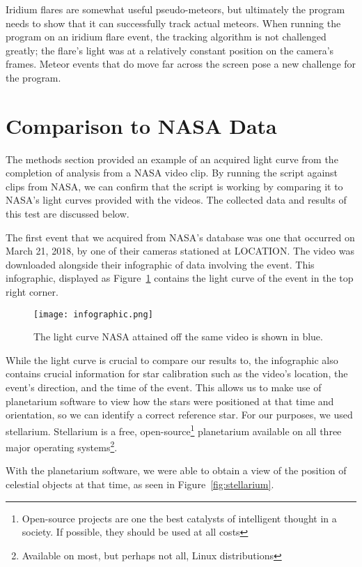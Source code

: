 Iridium flares are somewhat useful pseudo-meteors, but ultimately the program needs to show that it can successfully track actual meteors. When running the program on an iridium flare event, the tracking algorithm is not challenged greatly; the flare's light was at a relatively constant position on the camera's frames. Meteor events that do move far across the screen pose a new challenge for the program.

\section{Comparison to NASA Data}

The methods section provided an example of an acquired light curve from the completion of analysis from a NASA video clip. By running the script against clips from NASA, we can confirm that the script is working by comparing it to NASA's light curves provided with the videos. The collected data and results of this test are discussed below.

The first event that we acquired from NASA's database was one that occurred on March 21, 2018, by one of their cameras stationed at LOCATION. The video was downloaded alongside their infographic of data involving the event. This infographic, displayed as Figure~\ref{fig:infographic} contains the light curve of the event in the top right corner. 

\begin{figure}[ht!]
	\centering
	\texttt{[image: infographic.png]}
	\caption{The light curve NASA attained off the same video is shown in blue.}
	\label{fig:infographic}
\end{figure}

While the light curve is crucial to compare our results to, the infographic also contains crucial information for star calibration such as the video's location, the event's direction, and the time of the event. This allows us to make use of planetarium software to view how the stars were positioned at that time and orientation, so we can identify a correct reference star. For our purposes, we used stellarium. Stellarium is a free, open-source\footnote{Open-source projects are one the best catalysts of intelligent thought in a society. If possible, they should be used at all costs} planetarium available on all three major operating systems\footnote{Available on most, but perhaps not all, Linux distributions}.

With the planetarium software, we were able to obtain a view of the position of celestial objects at that time, as seen in Figure~\ref{fig:stellarium}.

